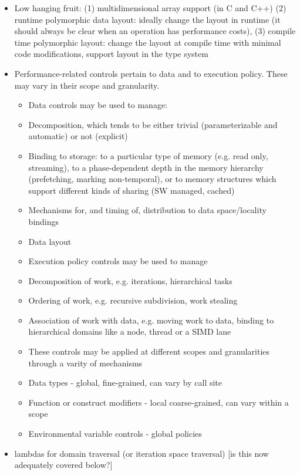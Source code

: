 \begin{itemize}
\begin{itemize}
\begin{itemize}
  \item Low hanging fruit: 
    (1) multidimensional array support (in C and C++) 
    (2) runtime polymorphic data layout: 
    ideally change the layout in runtime (it should always be clear when an operation has performance costs),
    (3) compile time polymorphic layout: change the layout at compile time with minimal code modifications, 
    support layout in the type system 
  \item Performance-related controls pertain to data and to execution policy.  These may vary in their scope and granularity.
    \begin{itemize}
    \item Data controls may be used to manage:
      \item Decomposition, which tends to be either trivial (parameterizable and automatic) or not (explicit)
      \item Binding to storage: to a particular type of memory (e.g. read only, streaming), to a phase-dependent depth in the memory hierarchy (prefetching, marking non-temporal), or to memory structures which support different kinds of sharing (SW managed, cached)
      \item Mechanisms for, and timing of, distribution to data space/locality bindings
      \item Data layout
    \item Execution policy controls may be used to manage
      \item Decomposition of work, e.g. iterations, hierarchical tasks
      \item Ordering of work, e.g. recursive subdivision, work stealing
      \item Association of work with data, e.g. moving work to data, binding to hierarchical domains like a node, thread or a SIMD lane
    \item These controls may be applied at different scopes and granularities through a varity of mechanisms
      \item Data types - global, fine-grained, can vary by call site
      \item Function or construct modifiers - local coarse-grained, can vary within a scope
      \item Environmental variable controls - global policies
    \end{itemize}
  \item lambdas for domain traversal (or iteration space traversal) [is this now adequately covered below?]
  \end{itemize}
  

\end{itemize}
\end{itemize}
